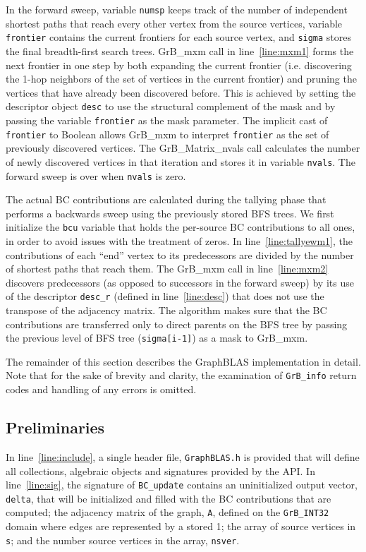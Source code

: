 In the forward sweep, variable {\tt numsp} keeps track of the number of
independent shortest paths that reach every other vertex from the source 
vertices, variable {\tt frontier} contains the current frontiers for each 
source vertex, and {\tt sigma} stores the final breadth-first search trees. 
GrB\_mxm call in line~\ref{line:mxm1} forms the next frontier in one step 
by both expanding the current frontier (i.e. discovering the 1-hop neighbors 
of the set of vertices in the current frontier) and pruning the vertices 
that have already been discovered before. This is achieved by setting the 
descriptor object {\tt desc} to use the structural complement of the mask 
and by passing the variable {\tt frontier} as the mask parameter. The 
implicit cast of {\tt frontier} to Boolean allows GrB\_mxm to interpret 
{\tt frontier} as the set of previously discovered vertices.  The 
GrB\_Matrix\_nvals call calculates the number of newly discovered vertices 
in that iteration and stores it in variable {\tt nvals}. The forward sweep 
is over when {\tt nvals} is zero.

The actual BC contributions are calculated during the tallying phase that 
performs a backwards sweep using the previously stored BFS trees. We first 
initialize the {\tt bcu} variable that holds the per-source BC contributions 
to all ones, in order to avoid issues with the treatment of zeros. In 
line~\ref{line:tallyewm1}, the contributions of each ``end'' vertex to its 
predecessors are divided by the number of shortest paths that reach them. The 
GrB\_mxm call in line~\ref{line:mxm2} discovers predecessors (as opposed to 
successors in the forward sweep) by its use of the descriptor {\tt desc\_r} 
(defined in line~\ref{line:desc}) that does not use the transpose of the 
adjacency matrix. The algorithm makes sure that the BC contributions are 
transferred only to direct parents on the BFS tree by passing the previous 
level of BFS tree ({\tt sigma[i-1]}) as a mask to GrB\_mxm. 

The remainder of this section describes the 
GraphBLAS implementation in detail.  
Note that for the sake of brevity and clarity, the examination of 
{\tt GrB\_info} return codes and handling of any errors is omitted.


\subsection{Preliminaries}

In line~\ref{line:include}, a single header file, {\tt GraphBLAS.h} is provided
that will define all collections, algebraic objects and signatures provided by the
API. In line~\ref{line:sig}, the signature of {\tt BC\_update} contains an uninitialized
output vector, {\tt delta}, that will be initialized and filled with the BC
contributions that are computed; the adjacency matrix of the graph, {\tt A}, 
defined on the {\tt GrB\_INT32} domain where edges are represented by a stored 1; the
array of source vertices in {\tt s}; and the number source vertices in the array,
{\tt nsver}. 

